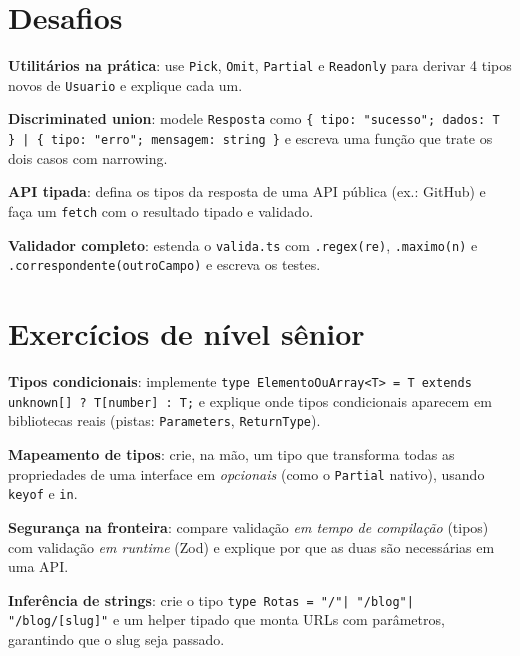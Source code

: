 \section{Desafios}

\begin{desafios}
  \item \textbf{Utilitários na prática}: use \texttt{Pick}, \texttt{Omit}, \texttt{Partial} e \texttt{Readonly} para derivar 4 tipos novos de \texttt{Usuario} e explique cada um.
  \item \textbf{Discriminated union}: modele \texttt{Resposta} como
  \texttt{\{ tipo: "sucesso"; dados: T \} | \{ tipo: "erro"; mensagem: string \}}
  e escreva uma função que trate os dois casos com narrowing.
  \item \textbf{API tipada}: defina os tipos da resposta de uma API pública
  (ex.: GitHub) e faça um \texttt{fetch} com o resultado tipado e validado.
  \item \textbf{Validador completo}: estenda o \texttt{valida.ts} com
  \texttt{.regex(re)}, \texttt{.maximo(n)} e \texttt{.correspondente(outroCampo)}
  e escreva os testes.
\end{desafios}

\section{Exercícios de nível sênior}

\begin{seniores}
  \item \textbf{Tipos condicionais}: implemente
  \texttt{type ElementoOuArray<T> = T extends unknown[] ? T[number] : T;} e
  explique onde tipos condicionais aparecem em bibliotecas reais (pistas:
  \texttt{Parameters}, \texttt{ReturnType}).
  \item \textbf{Mapeamento de tipos}: crie, na mão, um tipo que transforma
  todas as propriedades de uma interface em \emph{opcionais} (como o
  \texttt{Partial} nativo), usando \texttt{keyof} e \texttt{in}.
  \item \textbf{Segurança na fronteira}: compare validação \emph{em tempo de
  compilação} (tipos) com validação \emph{em runtime} (Zod) e explique por que
  as duas são necessárias em uma API.
  \item \textbf{Inferência de strings}: crie o tipo
  \texttt{type Rotas = "/"| "/blog"| "/blog/[slug]"} e um helper tipado que
  monta URLs com parâmetros, garantindo que o slug seja passado.
\end{seniores}

